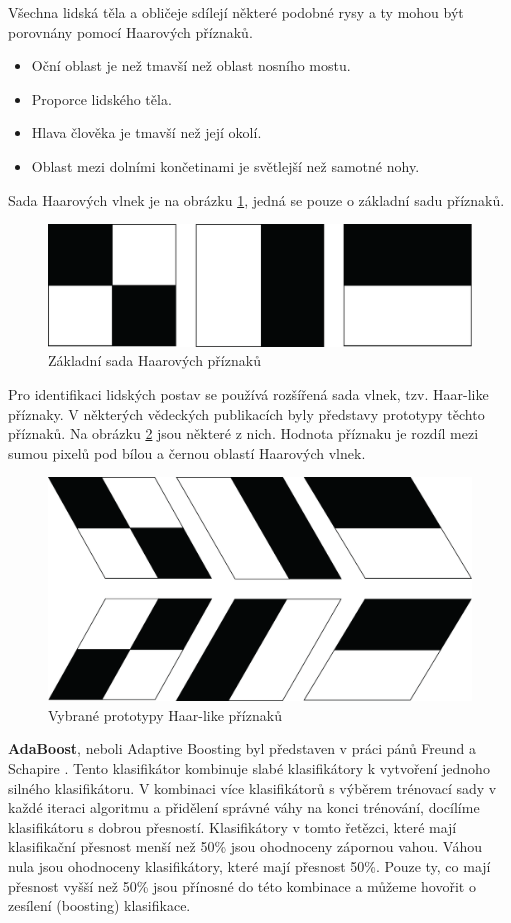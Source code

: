 Všechna lidská těla a obličeje sdílejí některé podobné rysy a ty mohou být porovnány pomocí Haarových příznaků.
\begin{itemize}
  \item{Oční oblast je než tmavší než oblast nosního mostu.}
  \item{Proporce lidského těla.}
  \item{Hlava člověka je tmavší než její okolí.}
  \item{Oblast mezi dolními končetinami je světlejší než samotné nohy.}
\end{itemize}
Sada Haarových vlnek je na obrázku \ref{fig:basichaarfeatures}, jedná se pouze o základní sadu příznaků.
\begin{figure}[H]
\centering
\includegraphics[width=.6\linewidth]{figures/haar_features}
\caption{Základní sada Haarových příznaků}
\label{fig:basichaarfeatures}
\end{figure}

Pro identifikaci lidských postav se používá rozšířená sada vlnek, tzv. Haar-like příznaky. V některých vědeckých publikacích byly představy prototypy těchto příznaků. Na obrázku \ref{fig:haarlike} jsou některé z nich. Hodnota příznaku je rozdíl mezi sumou pixelů pod bílou a černou oblastí Haarových vlnek.
\begin{figure}[H]
\centering
\includegraphics[width=.5\linewidth]{figures/haar_like}
\caption{Vybrané prototypy Haar-like příznaků}
\label{fig:haarlike}
\end{figure}

\textbf{AdaBoost}, neboli Adaptive Boosting byl představen v práci pánů Freund a Schapire \cite{adaboost}. Tento klasifikátor kombinuje slabé klasifikátory k vytvoření jednoho silného klasifikátoru. V kombinaci více klasifikátorů s výběrem trénovací sady v každé iteraci algoritmu a přidělení správné váhy na konci trénování, docílíme klasifikátoru s dobrou přesností. Klasifikátory v tomto řetězci, které mají klasifikační přesnost menší než 50\% jsou ohodnoceny zápornou vahou. Váhou nula jsou ohodnoceny klasifikátory, které mají přesnost 50\%. Pouze ty, co mají přesnost vyšší než 50\% jsou přínosné do této kombinace a můžeme hovořit o zesílení (boosting) klasifikace. 

